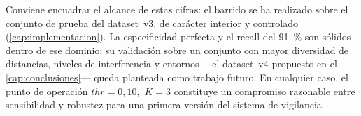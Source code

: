 Conviene encuadrar el alcance de estas cifras: el barrido se ha realizado sobre el conjunto de prueba del dataset~v3, de carácter interior y controlado (\cref{cap:implementacion}). La especificidad perfecta y el recall del \SI{91}{\percent} son sólidos dentro de ese dominio; su validación sobre un conjunto con mayor diversidad de distancias, niveles de interferencia y entornos ---el dataset~v4 propuesto en el \cref{cap:conclusiones}--- queda planteada como trabajo futuro. En cualquier caso, el punto de operación $\mathit{thr}=0{,}10$,\, $K=3$ constituye un compromiso razonable entre sensibilidad y robustez para una primera versión del sistema de vigilancia.
